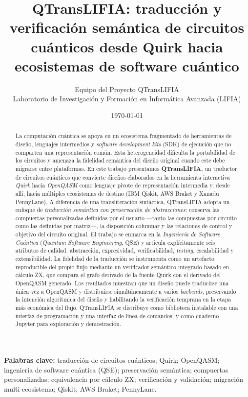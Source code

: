 \documentclass[11pt,a4paper]{article}
\title{\bfseries QTransLIFIA: traducción y verificación semántica de circuitos \\
cuánticos desde Quirk hacia ecosistemas de software cuántico}
\author{
  Equipo del Proyecto QTransLIFIA\\
  \small Laboratorio de Investigación y Formación en Informática Avanzada (LIFIA)
}
\date{\today}
\begin{document}
\maketitle

\begin{abstract}
\noindent
La computación cuántica se apoya en un ecosistema fragmentado de herramientas de diseño,
lenguajes intermedios y \emph{software development kits} (SDK) de ejecución que no
comparten una representación común. Esta heterogeneidad dificulta la portabilidad de los
circuitos y amenaza la fidelidad semántica del diseño original cuando este debe migrarse
entre plataformas. En este trabajo presentamos \textbf{QTransLIFIA}, un traductor de
circuitos cuánticos que convierte diseños elaborados en la herramienta interactiva
\emph{Quirk} hacia \emph{OpenQASM} como lenguaje pivote de representación intermedia y,
desde allí, hacia múltiples ecosistemas de destino (IBM Qiskit, AWS Braket y Xanadu
PennyLane). A diferencia de una transliteración sintáctica, QTransLIFIA adopta un enfoque
de \emph{traducción semántica con preservación de abstracciones}: conserva las compuertas
personalizadas definidas por el usuario ---tanto las compuestas por circuito como las
definidas por matriz---, la disposición columnar y las relaciones de control y objetivo del
circuito original. El trabajo se enmarca en la \emph{Ingeniería de Software Cuántica}
(\emph{Quantum Software Engineering}, QSE) y articula explícitamente seis atributos de
calidad: abstracción, expresividad, verificabilidad, \emph{testing}, escalabilidad y
extensibilidad. La fidelidad de la traducción se instrumenta como un artefacto reproducible
del propio flujo mediante un verificador semántico integrado basado en cálculo ZX, que
compara el grafo derivado de la fuente Quirk con el derivado del OpenQASM generado. Los
resultados muestran que un diseño puede traducirse una única vez a OpenQASM y distribuirse
simultáneamente a varios \emph{backends}, preservando la intención algorítmica del diseño y
habilitando la verificación temprana en la etapa más económica del flujo. QTransLIFIA se
distribuye como biblioteca instalable con una interfaz de programación y una interfaz de
línea de comandos, y como cuaderno Jupyter para exploración y demostración.
\end{abstract}

\noindent\textbf{Palabras clave:} traducción de circuitos cuánticos; Quirk; OpenQASM;
ingeniería de software cuántica (QSE); preservación semántica; compuertas personalizadas;
equivalencia por cálculo ZX; verificación y validación; migración multi-ecosistema; Qiskit;
AWS Braket; PennyLane.
\end{document}

